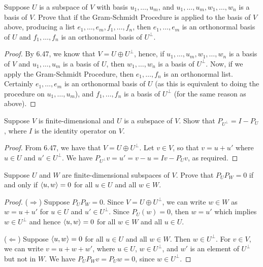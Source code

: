 \begin{exercise}{3}
  Suppose $U$ is a subspace of $V$ with basis $u_1,\dots,u_m$, and $u_1,\dots,u_m,w_1,\dots,w_n$ is a basis of $V$. Prove that if the Gram-Schmidt Procedure is applied to the basis of $V$ above, producing a list $e_1,\dots,e_m,f_1,\dots,f_n$, then $e_1,\dots,e_m$ is an orthonormal basis of $U$ and $f_1,\dots,f_n$ is an orthonormal basis of $U^\perp$.
\end{exercise}
\begin{proof}
 By 6.47, we know that $V=U\oplus U^\perp$, hence, if $u_1,
 \dots,u_m,w_1,\dots,w_n$ is a basis of $V$ and $u_1,\dots,u_m$ is a basis of $U$, then $w_1,\dots,w_n$ is a basis of $U^\perp$. Now, if we apply the Gram-Schmidt Procedure, then $e_1,\dots,f_n$ is an orthonormal list. Certainly $e_1,\dots,e_m$ is an orthonormal basis of $U$ (as this is equivalent to doing the procedure on $u_1,\dots,u_m$), and $f_1,\dots,f_n$ is a basis of $U^\perp$ (for the same reason as above).
\end{proof}

\begin{exercise}{5}
  Suppose $V$ is finite-dimensional and $U$ is a subspace of $V$. Show that $P_{U^\perp}=I-P_U$, where $I$ is the identity operator on $V$.
\end{exercise}
\begin{proof}
 From 6.47, we have that $V=U\oplus U^\perp$. Let $v\in V$, so that $v=u+u'$ where $u\in U$ and $u'\in U^\perp$. We have $P_{U^\perp}v = u' =v-u =Iv-P_Uv$, as required.
\end{proof}

\begin{exercise}{6}
  Suppose $U$ and $W$ are finite-dimensional subspaces of $V$. Prove that $P_UP_W=0$ if and only if $\langle u,w\rangle=0$ for all $u\in U$ and all $w\in W$.
\end{exercise}
\begin{proof}
 ($\Rightarrow$) Suppose $P_UP_W=0$. Since $V=U\oplus U^\perp$, we can write $w\in W$ as $w=u+u'$ for $u\in U$ and $u'\in U^\perp$. Since $P_U(w)=0$, then $w=u'$ which implies $w\in U^\perp$ and hence $\langle u,w\rangle=0$ for all $w\in W$ and all $u\in U$.

 ($\Leftarrow$) Suppose $\langle u,w\rangle=0$ for all $u\in U$ and all $w\in W$. Then $w\in U^\perp$. For $v\in V$, we can write $v=u+w+w'$, where $u\in U$, $w\in U^\perp$, and $w'$ is an element of $U^\perp$ but not in $W$. We have $P_UP_Wv =P_Uw =0$, since $w\in U^\perp$.
\end{proof}

